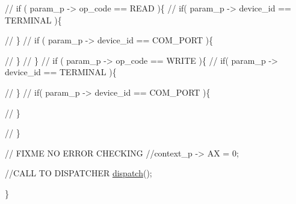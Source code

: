 \begin{DoxyCode}
        \textcolor{comment}{// if ( param\_p -> op\_code == READ )\{}
                \textcolor{comment}{// if( param\_p -> device\_id == TERMINAL )\{}
                
                \textcolor{comment}{// \}}
                \textcolor{comment}{// if ( param\_p -> device\_id == COM\_PORT )\{}
                
                \textcolor{comment}{// \}}
        \textcolor{comment}{// \}}
        \textcolor{comment}{// if ( param\_p -> op\_code == WRITE )\{}
                \textcolor{comment}{// if( param\_p -> device\_id == TERMINAL )\{}
                
                \textcolor{comment}{// \}}
                \textcolor{comment}{// if( param\_p -> device\_id == COM\_PORT )\{}
                
                \textcolor{comment}{// \}}
                
        \textcolor{comment}{// \}}
        
        

        
        \textcolor{comment}{// FIXME NO ERROR CHECKING }
        \textcolor{comment}{//context\_p -> AX = 0;}
        
        \textcolor{comment}{//CALL TO DISPATCHER}
        \hyperlink{mpx__r3_8c_ad4150c832feb766384417ab7bae70089}{dispatch}();
        
\}
\end{DoxyCode}


